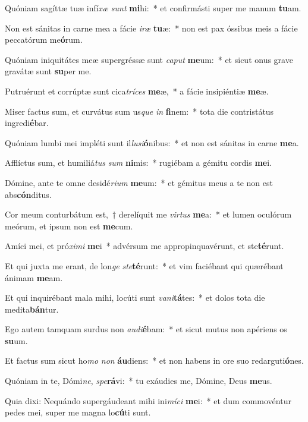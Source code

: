 \item Quóniam sagíttæ tuæ infí\textit{xæ} \textit{sunt} \textbf{mi}hi:~* et confirmásti super me manum \textbf{tu}am.
\item Non est sánitas in carne mea a fácie \textit{i}\textit{ræ} \textbf{tu}æ:~* non est pax óssibus meis a fácie peccatórum me\textbf{ó}rum.
\item Quóniam iniquitátes meæ supergréssæ sunt \textit{ca}\textit{put} \textbf{me}um:~* et sicut onus grave gravátæ sunt \textbf{su}per me.
\item Putruérunt et corrúptæ sunt cica\textit{trí}\textit{ces} \textbf{me}æ,~* a fácie insipiéntiæ \textbf{me}æ.
\item Miser factus sum, et curvátus sum us\textit{que} \textit{in} \textbf{fi}nem:~* tota die contristátus ingredi\textbf{é}bar.
\item Quóniam lumbi mei impléti sunt il\textit{lu}\textit{si}\textbf{ó}nibus:~* et non est sánitas in carne \textbf{me}a.
\item Afflíctus sum, et humiliá\textit{tus} \textit{sum} \textbf{ni}mis:~* rugiébam a gémitu cordis \textbf{me}i.
\item Dómine, ante te omne desidé\textit{ri}\textit{um} \textbf{me}um:~* et gémitus meus a te non est abs\textbf{cón}ditus.
\item Cor meum conturbátum est,~† derelíquit me \textit{vir}\textit{tus} \textbf{me}a:~* et lumen oculórum meórum, et ipsum non est \textbf{me}cum.
\item Amíci mei, et pró\textit{xi}\textit{mi} \textbf{me}i~* advérsum me appropinquavérunt, et ste\textbf{té}runt.
\item Et qui juxta me erant, de lon\textit{ge} \textit{ste}\textbf{té}runt:~* et vim faciébant qui quærébant ánimam \textbf{me}am.
\item Et qui inquirébant mala mihi, locúti sunt \textit{va}\textit{ni}\textbf{tá}tes:~* et dolos tota die medita\textbf{bán}tur.
\item Ego autem tamquam surdus non \textit{au}\textit{di}\textbf{é}bam:~* et sicut mutus non apériens os \textbf{su}um.
\item Et factus sum sicut ho\textit{mo} \textit{non} \textbf{áu}diens:~* et non habens in ore suo redarguti\textbf{ó}nes.
\item Quóniam in te, Dómi\textit{ne}, \textit{spe}\textbf{rá}vi:~* tu exáudies me, Dómine, Deus \textbf{me}us.
\item Quia dixi: Nequándo supergáudeant mihi ini\textit{mí}\textit{ci} \textbf{me}i:~* et dum commovéntur pedes mei, super me magna lo\textbf{cú}ti sunt.
